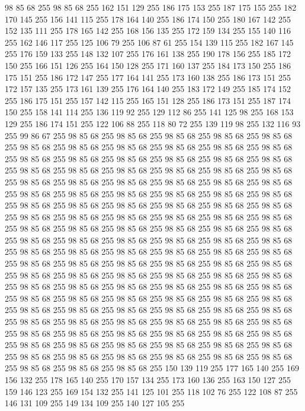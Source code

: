 98 85 68 255 98 85 68 255 162 151 129 255 186 175 153 255 187 175 155 255 182 170 145 255 156 141 115 255 178 164 140 255 186 174 150 255 180 167 142 255 152 135 111 255 178 165 142 255 168 156 135 255 172 159 134 255 155 140 116 255 162 146 117 255 125 106 79 255 106 87 61 255 154 139 115 255 182 167 145 255 176 159 133 255 148 132 107 255 176 161 138 255 190 178 156 255 185 172 150 255 166 151 126 255 164 150 128 255 171 160 137 255 184 173 150 255 186 175 151 255 186 172 147 255 177 164 141 255 173 160 138 255 186 173 151 255 172 157 135 255 173 161 139 255 176 164 140 255 183 172 149 255 185 174 152 255 186 175 151 255 157 142 115 255 165 151 128 255 186 173 151 255 187 174 150 255 158 141 114 255 136 119 92 255 129 112 86 255 141 125 98 255 168 153 129 255 186 174 151 255 122 106 88 255 118 80 72 255 139 119 98 255 132 116 93 255 99 86 67 255 98 85 68 255 98 85 68 255 98 85 68 255 98 85 68 255 98 85 68 255 98 85 68 255 98 85 68 255 98 85 68 255 98 85 68 255
98 85 68 255 98 85 68 255 98 85 68 255 98 85 68 255 98 85 68 255 98 85 68 255 98 85 68 255 98 85 68 255 98 85 68 255 98 85 68 255 98 85 68 255 98 85 68 255 98 85 68 255 98 85 68 255 98 85 68 255 98 85 68 255 98 85 68 255 98 85 68 255 98 85 68 255 98 85 68 255 98 85 68 255 98 85 68 255 98 85 68 255 98 85 68 255 98 85 68 255 98 85 68 255 98 85 68 255 98 85 68 255 98 85 68 255 98 85 68 255 98 85 68 255 98 85 68 255 98 85 68 255 98 85 68 255 98 85 68 255 98 85 68 255 98 85 68 255 98 85 68 255 98 85 68 255 98 85 68 255 98 85 68 255 98 85 68 255 98 85 68 255 98 85 68 255 98 85 68 255 98 85 68 255 98 85 68 255 98 85 68 255 98 85 68 255 98 85 68 255 98 85 68 255 98 85 68 255 98 85 68 255 98 85 68 255 98 85 68 255 98 85 68 255 98 85 68 255 98 85 68 255 98 85 68 255 98 85 68 255 98 85 68 255 98 85 68 255 98 85 68 255 98 85 68 255
98 85 68 255 98 85 68 255 98 85 68 255 98 85 68 255 98 85 68 255 98 85 68 255 98 85 68 255 98 85 68 255 98 85 68 255 98 85 68 255 98 85 68 255 98 85 68 255 98 85 68 255 98 85 68 255 98 85 68 255 98 85 68 255 98 85 68 255 98 85 68 255 98 85 68 255 98 85 68 255 98 85 68 255 98 85 68 255 98 85 68 255 98 85 68 255 98 85 68 255 98 85 68 255 98 85 68 255 98 85 68 255 98 85 68 255 98 85 68 255 98 85 68 255 98 85 68 255 98 85 68 255 98 85 68 255 98 85 68 255 98 85 68 255 98 85 68 255 98 85 68 255 98 85 68 255 98 85 68 255 98 85 68 255 98 85 68 255 98 85 68 255 98 85 68 255 98 85 68 255 98 85 68 255 98 85 68 255 98 85 68 255 98 85 68 255 150 139 119 255 177 165 140 255 169 156 132 255 178 165 140 255 170 157 134 255 173 160 136 255 163 150 127 255 159 146 123 255 169 154 132 255 141 125 101 255 118 102 76 255 122 108 87 255 146 131 109 255 149 134 109 255 140 127 105 255
